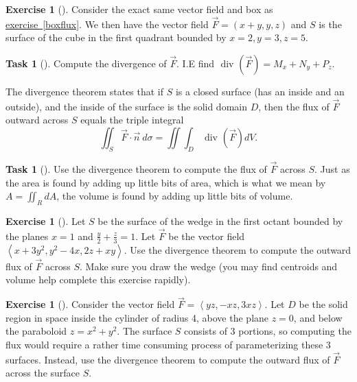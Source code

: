 \documentclass[10pt,]{book}
\theoremstyle{plain}
\theoremstyle{definition}
\theoremstyle{definition}
\theoremstyle{definition}
\theoremstyle{definition}
\newtheorem{exploration}[project]{Exercise}
\newtheorem{task}[project]{Task}
\theoremstyle{definition}
\numberwithin{equation}{section}
\newcommand{\ds}{\displaystyle}
\newcommand{\lt}{<}
\begin{document}
\begin{exploration}[]\label{exploration-310}
Consider the exact same vector field and box as \hyperref[boxflux]{exercise~\ref{boxflux}}. We then have the vector field \(\vec F=(x+y,y,z)\) and \(S\) is the surface of the cube in the first quadrant bounded by {\(x=2,y=3,z=5\)}.%
\begin{task}[]\label{task-839}
Compute the divergence of \(\vec F\). I.E find \(\text{ div } (\vec F) = M_x+N_y+P_z\).%
\end{task}
The divergence theorem states that if \(S\) is a closed surface (has an inside and an outside), and the inside of the surface is the solid domain \(D\), then the flux of \(\vec F\) outward across \(S\) equals the triple integral%
\begin{equation*}
\iint_S\vec F\cdot \vec n\ d\sigma = \iint\int_D \text{ div } (\vec F)dV.
\end{equation*}
%
\begin{task}[]\label{task-840}
Use the divergence theorem to compute the flux of \(\vec F\) across \(S\). Just as the area is found by adding up little bits of area, which is what we mean by \(A=\iint_R dA\), the volume is found by adding up little bits of volume.%
%
\end{task}
\end{exploration}
\begin{exploration}[]\label{exploration-311}
Let \(S\) be the surface of the wedge in the first octant bounded by the planes \(x=1\) and \(\ds\frac{y}{2}+\frac{z}{3}=1\). Let \(\vec F\) be the vector field \(\left\lt x+3y^2,y^2-4x,2z+xy\right>\). Use the divergence theorem to compute the outward flux of \(\vec F\) across \(S\). Make sure you draw the wedge (you may find centroids and volume help complete this exercise rapidly).%
\end{exploration}
\begin{exploration}[]\label{exploration-312}
Consider the vector field \(\vec F = \left\lt yz,-xz,3xz\right>\). Let \(D\) be the solid region in space inside the cylinder of radius 4, above the plane \(z=0\), and below the paraboloid \(z=x^2+y^2\). The surface \(S\) consists of 3 portions, so computing the flux would require a rather time consuming process of parameterizing these 3 surfaces. Instead, use the divergence theorem to compute the outward flux of \(\vec F\) across the surface \(S\).%
\end{exploration}
%
\backmatter
%
%
%
\end{document}
